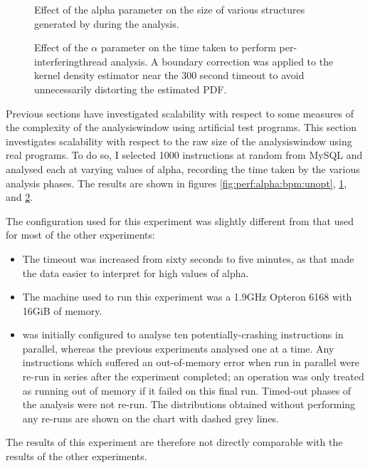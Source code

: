 \begin{figure}
  \caption{Effect of the \gls{alpha} parameter on the size of various
    structures generated by {\technique} during the analysis.}
  \label{fig:eval:time_breakdown:crashing_size}
\end{figure}

\begin{figure}
  \caption{Effect of the $\alpha$ parameter on the time taken to
    perform per-\gls{interferingthread} analysis. A boundary
    correction was applied to the kernel density estimator near the
    300 second timeout to avoid unnecessarily distorting the estimated
    PDF.}
  \label{fig:perf:alpha:gsc:unopt}
\end{figure}

Previous sections have investigated scalability with respect to some
measures of the complexity of the \gls{analysiswindow} using
artificial test programs.  This section investigates scalability with
respect to the raw size of the \gls{analysiswindow} using real
programs.  To do so, I selected 1000 instructions at random from MySQL
and analysed each at varying values of \gls{alpha}, recording the time
taken by the various analysis phases.  The results are shown in
figures \ref{fig:perf:alpha:bpm:unopt},
\ref{fig:eval:time_breakdown:crashing_size}, and
\ref{fig:perf:alpha:gsc:unopt}.    


The configuration used for this experiment was slightly different from
that used for most of the other experiments:
\begin{itemize}
\item The timeout was increased from sixty seconds to five minutes, as
  that made the data easier to interpret for high values of
  \gls{alpha}.
\item The machine used to run this experiment was a 1.9GHz Opteron
  6168 with 16GiB of memory.
\item {\Implementation} was initially configured to analyse ten
  potentially-crashing instructions in parallel, whereas the previous
  experiments analysed one at a time.  Any instructions which suffered
  an out-of-memory error when run in parallel were re-run in series
  after the experiment completed; an operation was only treated as
  running out of memory if it failed on this final run.  Timed-out
  phases of the analysis were not re-run.  The distributions obtained
  without performing any re-runs are shown on the chart with dashed
  grey lines.
\end{itemize}
The results of this experiment are therefore not directly comparable
with the results of the other experiments.

